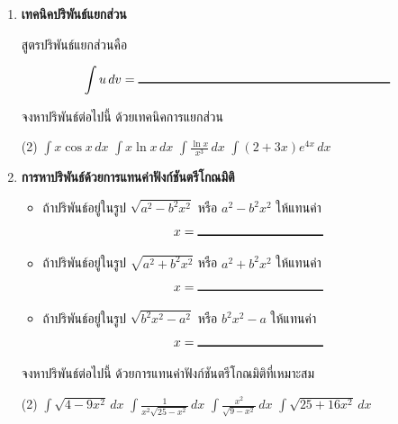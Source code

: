 \begin{enumerate}

\item \textbf{เทคนิคปริพันธ์แยกส่วน}

สูตรปริพันธ์แยกส่วนคือ

\[ \int u \, dv = \rule{200pt}{1pt}\]

จงหาปริพันธ์ต่อไปนี้ ด้วยเทคนิคการแยกส่วน
\begin{tasks}[after-skip=150pt, after-item-skip=150pt](2)
\task $\int  x \cos x \, dx$
\task $\int x \ln x \, dx$
\task $\int \frac{\ln x}{x^3} \, dx$
\task $\int (2+3x)e^{4x} \, dx$
\end{tasks}

\newpage

\item \textbf{การหาปริพันธ์ด้วยการแทนค่าฟังก์ชันตรีโกณมิติ}

\begin{itemize}
\item ถ้าปริพันธ์อยู่ในรูป $\sqrt{a^2 - b^2 x^2}$ หรือ $a^2 - b^2 x^2$ ให้แทนค่า
\[ x = \rule{100pt}{1pt} \]
\item ถ้าปริพันธ์อยู่ในรูป $\sqrt{a^2 + b^2 x^2}$ หรือ $a^2 + b^2 x^2$ ให้แทนค่า
\[ x = \rule{100pt}{1pt} \]
\item ถ้าปริพันธ์อยู่ในรูป $\sqrt{b^2 x^2 - a^2 }$ หรือ $ b^2 x^2 -  a$ ให้แทนค่า
\[ x = \rule{100pt}{1pt} \]
\end{itemize}

จงหาปริพันธ์ต่อไปนี้ ด้วยการแทนค่าฟังก์ชันตรีโกณมิติที่เหมาะสม
\begin{tasks}[after-item-skip = 150pt, after-skip=150pt](2)
\task $\int \sqrt{4 - 9x^2} \, dx$
\task $\int \frac{1}{x^2\sqrt{25-x^2}} \, dx$
\task $\int \frac{x^2}{\sqrt{9-x^2}} \, dx$
\task $\int \sqrt{25 + 16x^2} \, dx$
\end{tasks}


\end{enumerate}
